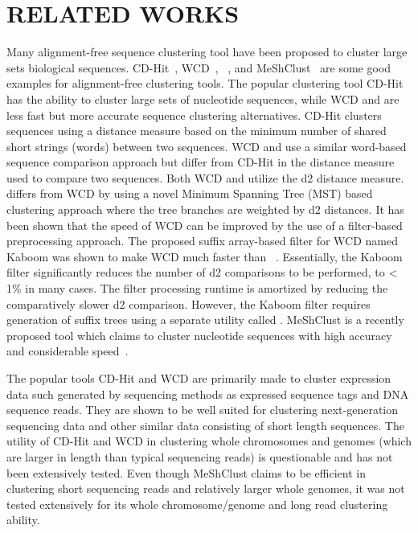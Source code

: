 \section{RELATED WORKS}

Many alignment-free sequence clustering tool have been proposed to
cluster large sets biological sequences. CD-Hit~\cite{li-06},
WCD~\cite{hazelhurst-08}, \peace~\cite{rao-10}, and
MeShClust~\cite{james-18} are some good examples for alignment-free
clustering tools. The popular clustering tool CD-Hit has the ability
to cluster large sets of nucleotide sequences, while WCD and \peace\/
are less fast but more accurate sequence clustering
alternatives. CD-Hit clusters sequences using a distance measure based
on the minimum number of shared short strings (words) between two
sequences.  WCD and \peace\/ use a similar word-based sequence
comparison approach but differ from CD-Hit in the distance measure
used to compare two sequences. Both WCD and \peace\/ utilize the d2
distance measure. \peace\/ differs from WCD by using a novel Minimum
Spanning Tree (MST) based clustering approach where the tree branches
are weighted by d2 distances.  It has been shown that the speed of WCD
can be improved by the use of a filter-based preprocessing
approach. The proposed suffix array-based filter for WCD named Kaboom
was shown to make WCD much faster than \peace~\cite{hazelhurst-11}.
Essentially, the Kaboom filter significantly reduces the number of d2
comparisons to be performed, to \textless\/ 1\% in many cases.  The
filter processing runtime is amortized by reducing the comparatively
slower d2 comparison.  However, the Kaboom filter requires generation
of suffix trees using a separate utility called .  MeShClust
is a recently proposed tool which claims to cluster nucleotide
sequences with high accuracy and considerable speed~\cite{james-18}.

The popular tools CD-Hit and WCD are primarily made to cluster
expression data such generated by sequencing methods as expressed
sequence tags and DNA sequence reads. They are shown to be well suited
for clustering next-generation sequencing data and other similar data
consisting of short length sequences. The utility of CD-Hit and WCD in
clustering whole chromosomes and genomes (which are larger in length
than typical sequencing reads) is questionable and has not been
extensively tested. Even though MeShClust claims to be efficient in
clustering short sequencing reads and relatively larger whole genomes,
it was not tested extensively for its whole chromosome/genome and long
read clustering ability.

